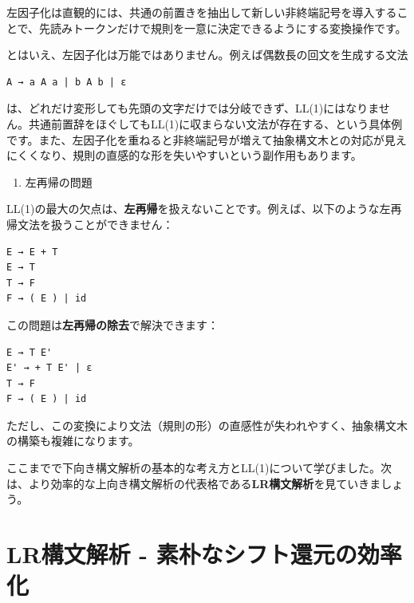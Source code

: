 左因子化は直観的には、共通の前置きを抽出して新しい非終端記号を導入することで、先読みトークンだけで規則を一意に決定できるようにする変換操作です。

とはいえ、左因子化は万能ではありません。例えば偶数長の回文を生成する文法

\begin{verbatim}
A → a A a | b A b | ε
\end{verbatim}

は、どれだけ変形しても先頭の文字だけでは分岐できず、LL(1)にはなりません。共通前置辞をほぐしてもLL(1)に収まらない文法が存在する、という具体例です。また、左因子化を重ねると非終端記号が増えて抽象構文木との対応が見えにくくなり、規則の直感的な形を失いやすいという副作用もあります。

\begin{enumerate}
\def\labelenumi{\arabic{enumi}.}
\setcounter{enumi}{1}
\tightlist
\item
  左再帰の問題
\end{enumerate}

LL(1)の最大の欠点は、\textbf{左再帰}を扱えないことです。例えば、以下のような左再帰文法を扱うことができません：

\begin{verbatim}
E → E + T
E → T
T → F
F → ( E ) | id
\end{verbatim}

この問題は\textbf{左再帰の除去}で解決できます：

\begin{verbatim}
E → T E'
E' → + T E' | ε
T → F
F → ( E ) | id
\end{verbatim}

ただし、この変換により文法（規則の形）の直感性が失われやすく、抽象構文木の構築も複雑になります。

ここまでで下向き構文解析の基本的な考え方とLL(1)について学びました。次は、より効率的な上向き構文解析の代表格である\textbf{LR構文解析}を見ていきましょう。

\hypertarget{chapter5-lrux69cbux6587ux89e3ux6790---ux7d20ux6734ux306aux30b7ux30d5ux30c8ux9084ux5143ux306eux52b9ux7387ux5316}{%
\section{LR構文解析 -
素朴なシフト還元の効率化}\label{chapter5-lrux69cbux6587ux89e3ux6790---ux7d20ux6734ux306aux30b7ux30d5ux30c8ux9084ux5143ux306eux52b9ux7387ux5316}}

